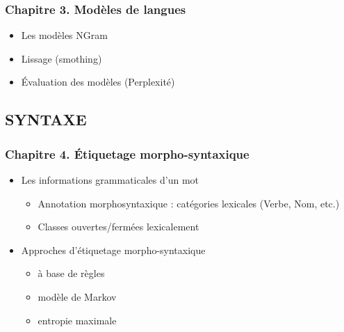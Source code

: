 \documentclass[11pt, a4paper]{article}
\begin{document}
\begin{tcolorbox}
\subsubsection*{Chapitre 3. Modèles de langues}

\begin{multicols}{2}
\begin{itemize}
	
	\item Les modèles NGram
	
	\item Lissage (smothing)
	
	\item Évaluation des modèles (Perplexité)
	
\end{itemize}
\end{multicols}
\end{tcolorbox}

\subsection*{\uppercase{Syntaxe}}

\begin{tcolorbox}
\subsubsection*{Chapitre 4. Étiquetage morpho-syntaxique}

\begin{multicols}{2}
\begin{itemize}
	
	\item Les informations grammaticales d'un mot
	\begin{itemize}
		\item Annotation morphosyntaxique : catégories lexicales (Verbe, Nom, etc.)
		\item Classes ouvertes/fermées lexicalement
	\end{itemize}
	
	\item Approches d'étiquetage morpho-syntaxique
	\begin{itemize}
		\item à base de règles
		\item modèle de Markov
		\item entropie maximale
	\end{itemize}
	
\end{itemize}
\end{multicols}
\end{tcolorbox}
\end{document}
